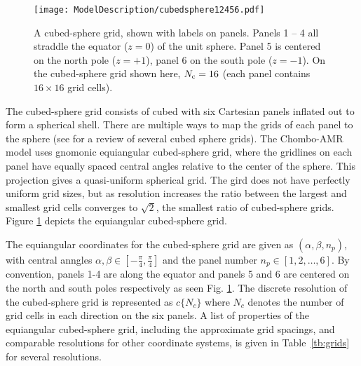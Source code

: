 \begin{figure}[htp]
\centerline{
\texttt{[image: ModelDescription/cubedsphere12456.pdf]} %
}
\caption{
A cubed-sphere grid, shown with labels on panels.
Panels 1 -- 4 all straddle the equator
($z = 0$) of the unit sphere.
Panel 5 is centered on the north pole ($z = +1$),
panel 6 on the south pole ($z = -1$).
On the cubed-sphere grid shown here,
$N_{\rm c} = 16$ (each panel contains $16 \times 16$ grid cells).
}
\label{fig:cubedsphere2dmaps}
\end{figure}

The cubed-sphere grid consists of cubed with six Cartesian panels inflated out to form a spherical shell. 
There are multiple ways to map the grids of each panel to the sphere (see \cite{Putnam:2007cs} for a review
of several cubed sphere grids).  The Chombo-AMR model uses gnomonic equiangular cubed-sphere grid, where the
gridlines on each panel have equally spaced central angles relative to the center of the sphere. This projection
gives a quasi-uniform spherical grid. The gird does not have perfectly uniform grid sizes, but as resolution increases
the ratio between the largest and smallest grid cells converges to $\sqrt{2}$, the smallest ratio of cubed-sphere
grids. Figure \ref{fig:cubedsphere2dmaps} depicts the equiangular cubed-sphere grid.

The equiangular coordinates for the cubed-sphere grid are given as $(\alpha, \beta, n_p)$, 
with central anngles $\alpha, \beta \in [-\frac{\pi}{4},\frac{\pi}{4}]$ and the panel number $n_p \in [1,2,\dots, 6]$. 
By convention, panels 1-4 are along the equator and panels 5 and 6 are centered on the north and south poles
respectively as seen Fig. \ref{fig:cubedsphere2dmaps}. The discrete resolution of the cubed-sphere grid is represented as  $c\{N_c\}$ where $N_c$
denotes the number of grid cells in each direction on the six panels.  A
list of properties of the equiangular cubed-sphere grid, including the
approximate grid spacings, and comparable resolutions for other coordinate systems, is given in
Table~\ref{tb:grids} for several resolutions.

